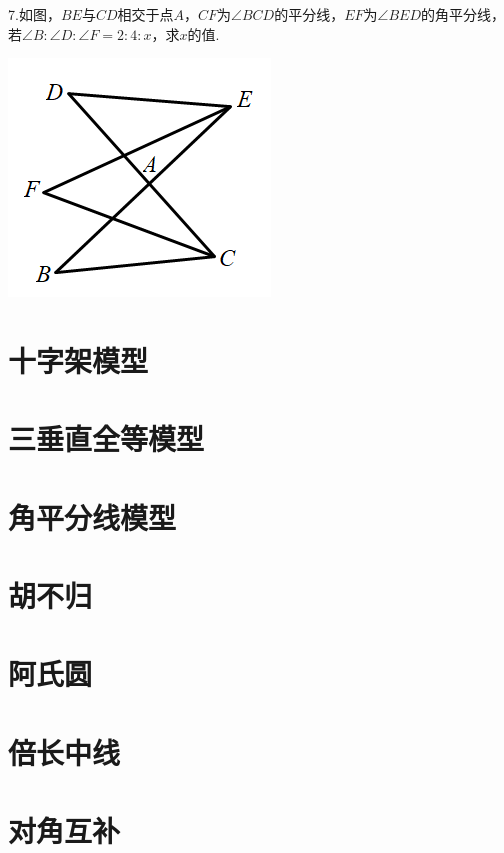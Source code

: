7.如图，$BE$与$CD$相交于点$A$，$CF$为$\angle BCD$的平分线，$EF$为$\angle BED$的角平分线，若$\angle B:\angle D:\angle F=2:4:x$，求$x$的值.

 \includegraphics[scale=0.5]{figure/bazhi14.PNG}



\section{十字架模型}
\section{三垂直全等模型}
\section{角平分线模型}
\section{胡不归}
\section{阿氏圆}
\section{倍长中线}
\section{对角互补}







